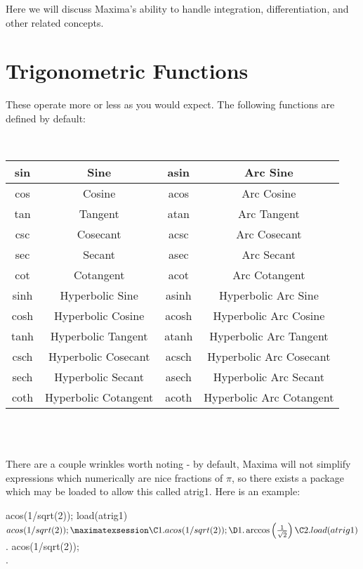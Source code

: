 
Here we will discuss Maxima's ability to handle integration, 
differentiation, and other related concepts.

\section{Trigonometric Functions}

These operate more or less as you would expect.  The following functions
are defined by default:

~

{\center \begin{tabular}{|c|c|c|c|}
\hline 
sin&
Sine&
asin&
Arc Sine\\
\hline
cos&
Cosine&
acos&
Arc Cosine\\
\hline 
tan&
Tangent&
atan&
Arc Tangent\\
\hline 
csc&
Cosecant&
acsc&
Arc Cosecant\\
\hline 
sec&
Secant&
asec&
Arc Secant\\
\hline 
cot&
Cotangent&
acot&
Arc Cotangent\\
\hline 
sinh&
Hyperbolic Sine&
asinh&
Hyperbolic Arc Sine\\
\hline 
cosh&
Hyperbolic Cosine&
acosh&
Hyperbolic Arc Cosine\\
\hline 
tanh&
Hyperbolic Tangent&
atanh&
Hyperbolic Arc Tangent\\
\hline 
csch&
Hyperbolic Cosecant&
acsch&
Hyperbolic Arc Cosecant\\
\hline 
sech&
Hyperbolic Secant&
asech&
Hyperbolic Arc Secant\\
\hline 
coth&
Hyperbolic Cotangent&
acoth&
Hyperbolic Arc Cotangent\\
\hline
\end{tabular} \par}

~\\

~

There are a couple wrinkles worth noting - by default, Maxima will not
simplify expressions which numerically are nice fractions of $\pi$, so
there exists a package which may be loaded to allow this called
atrig1.  Here is an example:

\beginmaximasession
acos(1/sqrt(2));
load(atrig1)$
acos(1/sqrt(2));
\maximatexsession
\C1.  acos(1/sqrt(2)); \\
\D1.   \arccos \left({{1}\over{\sqrt{2}}}\right) \\
\C2.  load(atrig1)$ \\
.  acos(1/sqrt(2)); \\
.   {{\pi}} \\
\endmaximasession

